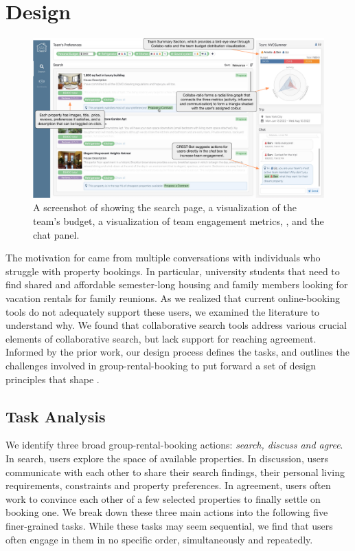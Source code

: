 
\section{Design}
\label{section:design}
\begin{figure}
    \centering
    \includegraphics[width=\textwidth]{images/ui-search.pdf}
    \caption{A screenshot of \tool showing the search page, a visualization of the team's budget, a visualization of team engagement metrics, \collaboRatio, and the chat panel.}
    \label{fig:ui_search}
\end{figure}

The motivation for \tool came from multiple conversations with individuals who struggle with property bookings. In particular, university students that need to find shared and affordable semester-long housing and family members looking for vacation rentals for family reunions. As we realized that current online-booking tools do not adequately support these users, we examined the literature to understand why. We found that collaborative search tools \cite{searchtogether, groupdynamicscollaborativesearch, c-dq,shareonewiki,resultsspace,slacksearch,algorithmiccollaborativesearch} address various crucial elements of collaborative search, but lack support for reaching agreement. Informed by the prior work, our design process defines the tasks, and outlines the challenges involved in group-rental-booking to put forward a set of design principles that shape \tool.


\subsection{Task Analysis}
\label{ssection:task}

We identify three broad group-rental-booking actions: \textit{search, discuss and agree}. In search, users explore the space of available properties. In discussion, users communicate with each other to share their search findings, their personal living requirements, constraints and property preferences. In agreement, users often work to convince each other of a few selected properties to finally settle on booking one. 
We break down these three main actions into the following five finer-grained tasks. While these tasks may seem sequential, we find that users often engage in them in no specific order, simultaneously and repeatedly.


